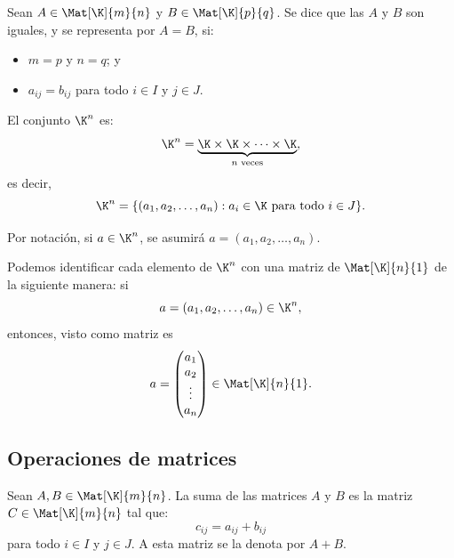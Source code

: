 \documentclass[a4,11pt]{aleph-notas}
\begin{document}
\begin{prop}
    Sean $A \in \Mat[\K]{m}{n}$ y $B \in \Mat[\K]{p}{q}$. Se dice que las $A$ y $B$ son iguales, y se representa por $A=B$, si:
    \begin{itemize}
    \item 
        $m=p$ y $n=q$; y
    \item 
        $a_{ij}=b_{ij}$ para todo $i\in I$ y $j \in J$.
    \end{itemize}
\end{prop}

\begin{defi}[Vectores]
    El conjunto $\K^n$ es:
    \[
        \K^n=\underbrace{\K\times\K\times\cdots\times\K}_{n\text{ veces}},
    \]
    es decir,
    \[
        \K^n=\{(a_1,a_2,\ldots,a_n):a_i\in\K\text{ para todo }i \in J\}.
    \]
\end{defi}

\begin{advertencia}
    Por notación, si $a\in\K^n$, se asumirá $a=(a_1,a_2,\ldots,a_n)$.
\end{advertencia}

\begin{advertencia}
    Podemos identificar cada elemento de $\K^n$ con una matriz de $\Mat[\K]{n}{1}$ de la siguiente manera: si
    \[
        a = (a_1,a_2,\ldots,a_n) \in \K^n,
    \]
    entonces, visto como matriz es
    \[
        a = 
        \begin{pmatrix}
            a_1\\a_2\\
            \vdots\\a_n
        \end{pmatrix}
        \in \Mat[\K]{n}{1}.
    \]
\end{advertencia}

\subsection{Operaciones de matrices}

\begin{defi}
    Sean $A, B \in \Mat[\K]{m}{n}$. La suma de las matrices $A$ y $B$ es la matriz $C\in \Mat[\K]{m}{n}$ tal que:
    \[ 
        c_{ij} = a_{ij} + b_{ij}
    \]
    para todo $i \in I$ y $j \in J$. A esta matriz se la denota por $A+B$.
\end{defi}
\end{document}
